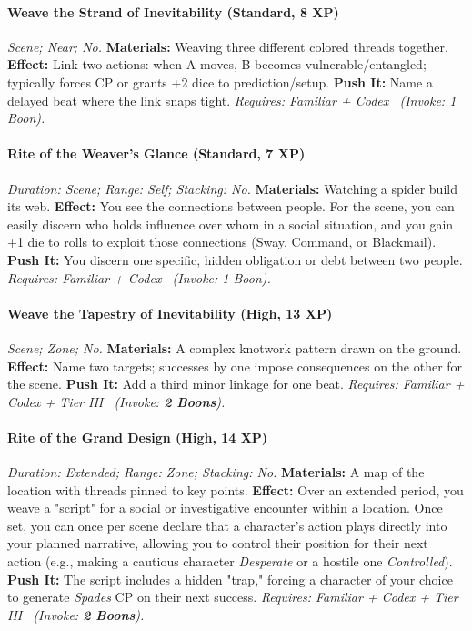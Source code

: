 \documentclass[12pt,twoside]{book}
\begin{document}
\paragraph{Weave the Strand of Inevitability (Standard, 8 XP)} \emph{Scene; Near; No.}
\textbf{Materials:} Weaving three different colored threads together.
\textbf{Effect:} Link two actions: when A moves, B becomes vulnerable/entangled; typically forces CP or grants +2 dice to prediction/setup.
\textbf{Push It:} Name a delayed beat where the link snaps tight.
\emph{Requires: Familiar + Codex \ (\textit{Invoke:} 1 Boon).}
\paragraph{Rite of the Weaver's Glance (Standard, 7 XP)} \emph{Duration: Scene; Range: Self; Stacking: No.}
\textbf{Materials:} Watching a spider build its web.
\textbf{Effect:} You see the connections between people. For the scene, you can easily discern who holds influence over whom in a social situation, and you gain +1 die to rolls to exploit those connections (Sway, Command, or Blackmail).
\textbf{Push It:} You discern one specific, hidden obligation or debt between two people.
\emph{Requires: Familiar + Codex \ (\textit{Invoke:} 1 Boon).}
\paragraph{Weave the Tapestry of Inevitability (High, 13 XP)} \emph{Scene; Zone; No.}
\textbf{Materials:} A complex knotwork pattern drawn on the ground.
\textbf{Effect:} Name two targets; successes by one impose consequences on the other for the scene.
\textbf{Push It:} Add a third minor linkage for one beat.
\emph{Requires: Familiar + Codex + Tier III \ (\textit{Invoke:} \textbf{2 Boons}).}
\paragraph{Rite of the Grand Design (High, 14 XP)} \emph{Duration: Extended; Range: Zone; Stacking: No.}
\textbf{Materials:} A map of the location with threads pinned to key points.
\textbf{Effect:} Over an extended period, you weave a "script" for a social or investigative encounter within a location. Once set, you can once per scene declare that a character's action plays directly into your planned narrative, allowing you to control their position for their next action (e.g., making a cautious character \emph{Desperate} or a hostile one \emph{Controlled}).
\textbf{Push It:} The script includes a hidden "trap," forcing a character of your choice to generate \emph{Spades} CP on their next success.
\emph{Requires: Familiar + Codex + Tier III \ (\textit{Invoke:} \textbf{2 Boons}).}
\end{document}
